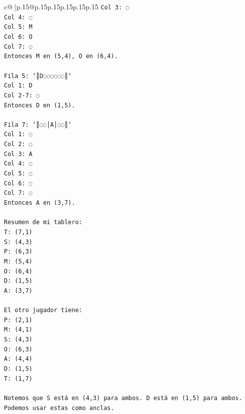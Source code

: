 \documentclass{article}
\begin{document}
{\begin{supertabular}{c@{$\;$}|p{.15\linewidth}@{}p{.15\linewidth}p{.15\linewidth}p{.15\linewidth}p{.15\linewidth}p{.15\linewidth}}
{{{\texttt{Col 3: ◌} \\
\texttt{Col 4: ◌} \\
\texttt{Col 5: M} \\
\texttt{Col 6: O} \\
\texttt{Col 7: ◌} \\
\texttt{Entonces M en (5,4), O en (6,4).} \\
\\ 
\texttt{Fila 5: `║D◌◌◌◌◌◌║`} \\
\texttt{Col 1: D} \\
\texttt{Col 2{-}7: ◌} \\
\texttt{Entonces D en (1,5).} \\
\\ 
\texttt{Fila 7: `║◌◌│A│◌◌║`} \\
\texttt{Col 1: ◌} \\
\texttt{Col 2: ◌} \\
\texttt{Col 3: A} \\
\texttt{Col 4: ◌} \\
\texttt{Col 5: ◌} \\
\texttt{Col 6: ◌} \\
\texttt{Col 7: ◌} \\
\texttt{Entonces A en (3,7).} \\
\\ 
\texttt{Resumen de mi tablero:} \\
\texttt{T: (7,1)} \\
\texttt{S: (4,3)} \\
\texttt{P: (6,3)} \\
\texttt{M: (5,4)} \\
\texttt{O: (6,4)} \\
\texttt{D: (1,5)} \\
\texttt{A: (3,7)} \\
\\ 
\texttt{El otro jugador tiene:} \\
\texttt{P: (2,1)} \\
\texttt{M: (4,1)} \\
\texttt{S: (4,3)} \\
\texttt{O: (6,3)} \\
\texttt{A: (4,4)} \\
\texttt{D: (1,5)} \\
\texttt{T: (1,7)} \\
\\ 
\texttt{Notemos que S está en (4,3) para ambos. D está en (1,5) para ambos.} \\
\texttt{Podemos usar estas como anclas.} \\
}}}
\end{supertabular}}
\end{document}
